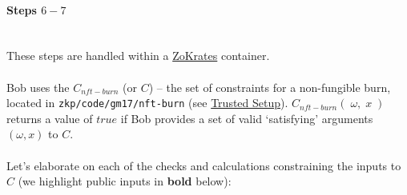 \documentclass{article}
\begin{document}
\paragraph{Steps $6 - 7$}
\ \\
These steps are handled within a \hyperref[sec:zokrates]{ZoKrates} container.\\
\\
Bob uses the $C_{nft-burn}$ (or $C$) -- the set of constraints for a non-fungible burn, located in \texttt{zkp/code/gm17/nft-burn} (see \hyperref[sec:trustedSetup]{Trusted Setup}). $C_{nft-burn}(\;\omega,\;x\;)$ returns a value of $true$ if Bob provides a set of valid `satisfying' arguments $(\omega, x)$ to $C$.\\
\\
Let's elaborate on each of the checks and calculations constraining the inputs to $C$ (we highlight public inputs in \textbf{bold} below):
\end{document}
